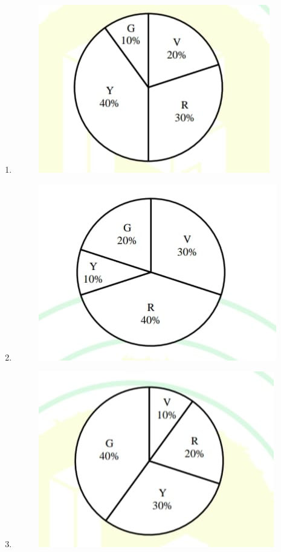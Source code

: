 \documentclass[journal,12pt,onecolumn]{article}
\theoremstyle{remark}
\begin{document}
\begin{enumerate}
    \hfill{}
   \begin{enumerate}
       \item \begin{figure}[H]
        \centering
        \includegraphics[width=0.7\columnwidth]{figs/2q-5a.jpg}
        \caption{}
        \label{fig:q4}
    \end{figure}
     \item \begin{figure}[H]
        \centering
        \includegraphics[width=0.7\columnwidth]{figs/2q-5b.jpg}
        \caption{}
        \label{fig:q4}
    \end{figure}
     \item \begin{figure}[H]
        \centering
        \includegraphics[width=0.7\columnwidth]{figs/2q-5c.jpg}

\end{figure}
\end{enumerate}
\end{enumerate}
\end{document}
